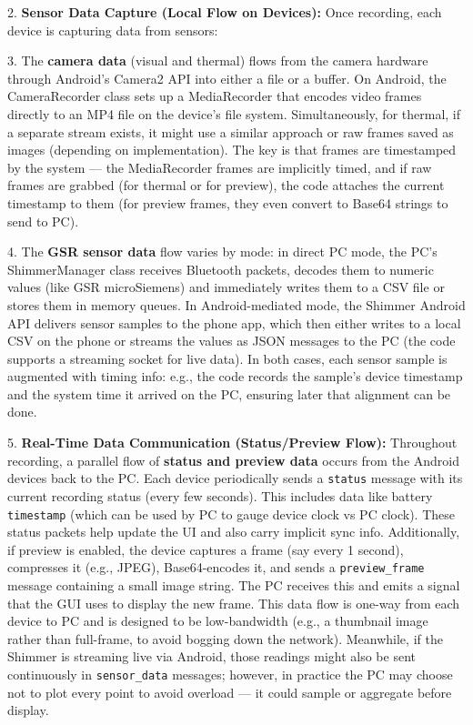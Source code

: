 \documentclass[11pt,a4paper]{report}
\begin{document}
2.  \textbf{Sensor Data Capture (Local Flow on Devices):} Once recording,
    each device is capturing data from sensors:

3.  The \textbf{camera data} (visual and thermal) flows from the camera
    hardware through Android's Camera2 API into either a file or a
    buffer. On Android, the CameraRecorder class sets up a MediaRecorder that
    encodes video frames directly to an MP4 file on the device's file
    system.
    Simultaneously, for thermal, if a separate stream exists, it might
    use a similar approach or raw frames saved as images (depending on
    implementation). The key is that frames are timestamped by the
    system --- the MediaRecorder frames are implicitly timed, and if raw
    frames are grabbed (for thermal or for preview), the code attaches
    the current timestamp to them (for preview frames, they even convert
    to Base64 strings to send to PC).

4.  The \textbf{GSR sensor data} flow varies by mode: in direct PC mode, the
    PC's ShimmerManager class receives Bluetooth packets, decodes them to
    numeric values (like GSR microSiemens) and immediately writes them
    to a CSV file or stores them in memory
    queues\cite{CortisolStressIndicator2020}.
    In Android-mediated mode, the Shimmer Android API delivers sensor
    samples to the phone app, which then either writes to a local CSV on
    the phone or streams the values as JSON messages to the PC (the code
    supports a streaming socket for live
    data).
    In both cases, each sensor sample is augmented with timing info:
    e.g., the code records the sample's device timestamp and the system
    time it arrived on the
    PC\cite{CortisolStressIndicator2020},
    ensuring later that alignment can be done.

5.  \textbf{Real-Time Data Communication (Status/Preview Flow):} Throughout
    recording, a parallel flow of \textbf{status and preview data} occurs
    from the Android devices back to the PC. Each device periodically
    sends a \texttt{status} message with its current recording status (every
    few
    seconds).
    This includes data like battery %
    \texttt{timestamp} (which can be used by PC to gauge device clock vs PC
    clock). These status packets help update the UI and also carry
    implicit sync info. Additionally, if preview is enabled, the device
    captures a frame (say every 1 second), compresses it (e.g., JPEG),
    Base64-encodes it, and sends a \texttt{preview\_frame} message containing a
    small image
    string\cite{DriverStressThermal2020}.
    The PC receives this and emits a signal that the GUI uses to display
    the new frame. This data flow is one-way from each device to PC and
    is designed to be low-bandwidth (e.g., a thumbnail image rather than
    full-frame, to avoid bogging down the network). Meanwhile, if the
    Shimmer is streaming live via Android, those readings might also be
    sent continuously in \texttt{sensor\_data}
    messages;
    however, in practice the PC may choose not to plot every point to
    avoid overload --- it could sample or aggregate before display.
\end{document}

